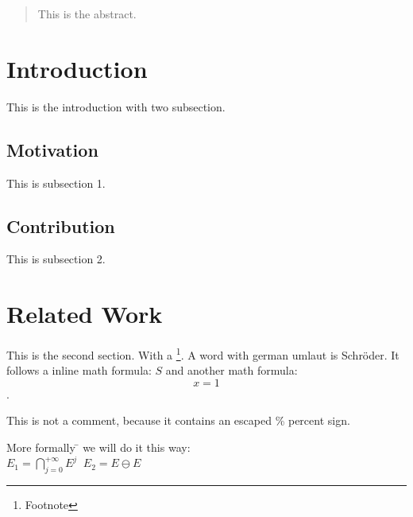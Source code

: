 


\begin{abstract}
This is the abstract.
\end{abstract}

\section{Introduction}
This is the introduction with two subsection.

\subsection{Motivation}
This is subsection 1.

\subsection{Contribution}
This is subsection 2.

\section{Related Work}
This is the second section. With a \footnote{Footnote}.
A word with german umlaut is Schr\"oder. It follows a inline math formula: $S$
and another math formula: $$x=1$$.

This is not a comment, because it contains an escaped \% percent sign.

\begin{tabbing}
More formally \=\+ we will do it this way:\\
$E_1=\bigcap_{j=0}^{+\infty}E^j\;\;E_2=E\ominus E$\\
\end{tabbing}

